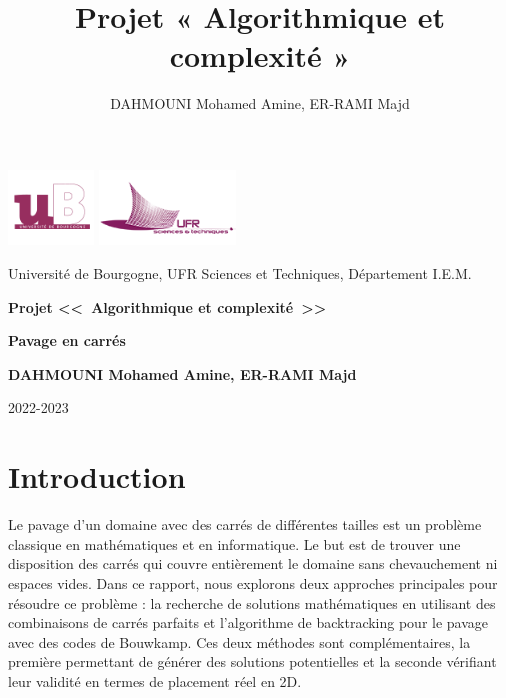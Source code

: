 \documentclass{article}
\title{Projet « Algorithmique et complexité »}
\author{DAHMOUNI Mohamed Amine, ER-RAMI Majd}
\begin{document}
\begin{titlepage}
\includegraphics[height=2cm]{image/logo-ub.png}
\hfill
\includegraphics[height=2cm]{image/logo-ufr.png}


\begin{center}
{\large{Université de Bourgogne, UFR Sciences et Techniques, Département I.E.M.}\par}

\vspace{1cm}
{\huge\bfseries Projet <<\ Algorithmique et complexité\ >>}\par
{\huge\bfseries Pavage en carrés}\par
{\bfseries DAHMOUNI Mohamed Amine, ER-RAMI Majd}\par

\end{center}
\tableofcontents

\vfill
{\hfill\large 2022-2023\par}

\end{titlepage}


\section{Introduction}

Le pavage d'un domaine avec des carrés de différentes tailles est un problème classique en mathématiques et en informatique. Le but est de trouver une disposition des carrés qui couvre entièrement le domaine sans chevauchement ni espaces vides. Dans ce rapport, nous explorons deux approches principales pour résoudre ce problème : la recherche de solutions mathématiques en utilisant des combinaisons de carrés parfaits et l'algorithme de backtracking pour le pavage avec des codes de Bouwkamp. Ces deux méthodes sont complémentaires, la première permettant de générer des solutions potentielles et la seconde vérifiant leur validité en termes de placement réel en 2D.
\end{document}

